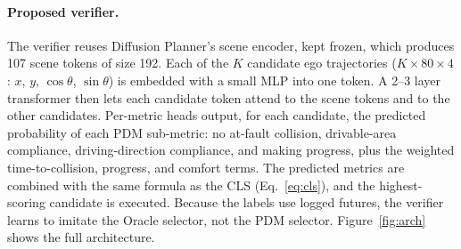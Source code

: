 \documentclass{article}
\begin{document}
\paragraph{Proposed verifier.}
The verifier reuses Diffusion Planner's scene encoder, kept frozen, which produces 107 scene tokens of size 192. Each of the $K$ candidate ego trajectories ($K\times80\times4$: $x$, $y$, $\cos\theta$, $\sin\theta$) is embedded with a small MLP into one token. A 2--3 layer transformer then lets each candidate token attend to the scene tokens and to the other candidates. Per-metric heads output, for each candidate, the predicted probability of each PDM sub-metric: no at-fault collision, drivable-area compliance, driving-direction compliance, and making progress, plus the weighted time-to-collision, progress, and comfort terms. The predicted metrics are combined with the same formula as the CLS (Eq.~\ref{eq:cls}), and the highest-scoring candidate is executed. Because the labels use logged futures, the verifier learns to imitate the Oracle selector, not the PDM selector. Figure~\ref{fig:arch} shows the full architecture.
\end{document}
